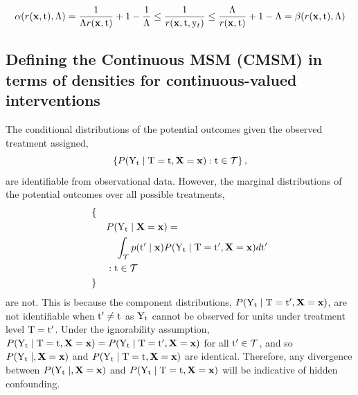\begin{equation}
    \alpha(r(\mathbf{x}, \mathrm{t}), \Lambda) = \frac{1}{\Lambda r(\mathbf{x}, \mathrm{t})} + 1 - \frac{1}{\Lambda} \leq \frac{1}{r(\mathbf{x}, \mathrm{t}, \mathrm{y}_t)} \leq \frac{\Lambda}{r(\mathbf{x}, \mathrm{t})} + 1 - \Lambda = \beta(r(\mathbf{x}, \mathrm{t}), \Lambda)
\end{equation}


\subsection{Defining the Continuous MSM (CMSM) in terms of densities for continuous-valued interventions}
\label{app:cont_msm}
The conditional distributions of the potential outcomes given the observed treatment assigned, 
\begin{equation*}
    \left\{ P(\mathrm{Y}_{\mathrm{t}} \mid \mathrm{T}=\mathrm{t}, \mathbf{X}=\mathbf{x}) : \mathrm{t} \in \mathcal{T} \right\},
\end{equation*}
are identifiable from observational data. However, the marginal distributions of the potential outcomes over all possible treatments, 
\begin{equation}
    \begin{split}
        \{\quad& \\
            &P(\mathrm{Y}_{\mathrm{t}} \mid \mathbf{X}=\mathbf{x}) = \\
            &\quad \int_{\mathcal{T}} p(\mathrm{t}^{\prime} \mid \mathbf{x}) P(\mathrm{Y}_{\mathrm{t}} \mid \mathrm{T}=\mathrm{t}^{\prime}, \mathbf{X}=\mathbf{x}) d\mathrm{t}^{\prime}  \\
            &: \mathrm{t} \in \mathcal{T} \\
        \}\quad&
    \end{split}
\end{equation}
are not.
This is because the component distributions, $P(\mathrm{Y}_{\mathrm{t}} \mid \mathrm{T}=\mathrm{t}^{\prime}, \mathbf{X}=\mathbf{x})$, are not identifiable when $\mathrm{t}^{\prime} \neq \mathrm{t}$ as $\mathrm{Y}_{\mathrm{t}}$ cannot be observed for units under treatment level $\mathrm{T} = \mathrm{t}^{\prime}$.
Under the ignorability assumption, $P(\mathrm{Y}_{\mathrm{t}} \mid \mathrm{T}=\mathrm{t}, \mathbf{X}=\mathbf{x}) = P(\mathrm{Y}_{\mathrm{t}} \mid \mathrm{T}=\mathrm{t}^{\prime}, \mathbf{X}=\mathbf{x})$ for all $\mathrm{t}^{\prime} \in \mathcal{T}$, and so $P(\mathrm{Y}_{\mathrm{t}} \mid, \mathbf{X}=\mathbf{x})$ and $P(\mathrm{Y}_{\mathrm{t}} \mid \mathrm{T}=\mathrm{t}, \mathbf{X}=\mathbf{x})$ are identical. 
Therefore, any divergence between $P(\mathrm{Y}_{\mathrm{t}} \mid, \mathbf{X}=\mathbf{x})$ and $P(\mathrm{Y}_{\mathrm{t}} \mid \mathrm{T}=\mathrm{t}, \mathbf{X}=\mathbf{x})$ will be indicative of hidden confounding.

